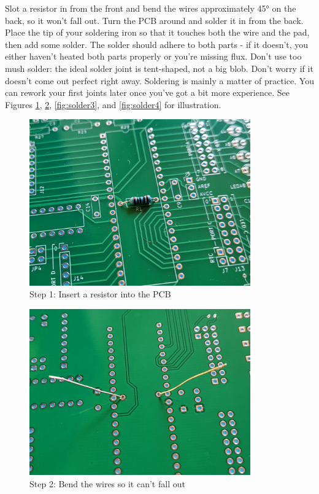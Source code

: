 \documentclass{article}
\begin{document}
Slot a resistor in from the front and bend the wires approximately 45° on the back, so it won't fall out. Turn the PCB around and solder it in from the back. Place the tip of your soldering iron so that it touches both the wire and the pad, then add some solder. The solder should adhere to both parts - if it doesn't, you either haven't heated both parts properly or you're missing flux. Don't use too mush solder: the ideal solder joint is tent-shaped, not a big blob. Don't worry if it doesn't come out perfect right away. Soldering is mainly a matter of practice. You can rework your first joints later once you've got a bit more experience. See Figures \ref{fig:solder1}, \ref{fig:solder2}, \ref{fig:solder3}, and \ref{fig:solder4} for illustration. 
\begin{figure}[htb]
\centering
\includegraphics[width=0.85\textwidth]{Pictures/Solder1.jpg}
\caption{Step 1: Insert a resistor into the PCB}
\label{fig:solder1}
\end{figure}
\begin{figure}[htb]
\centering
\includegraphics[width=0.85\textwidth]{Pictures/Solder2.jpg}
\caption{Step 2: Bend the wires so it can't fall out}
\label{fig:solder2}
\end{figure}
\end{document}
